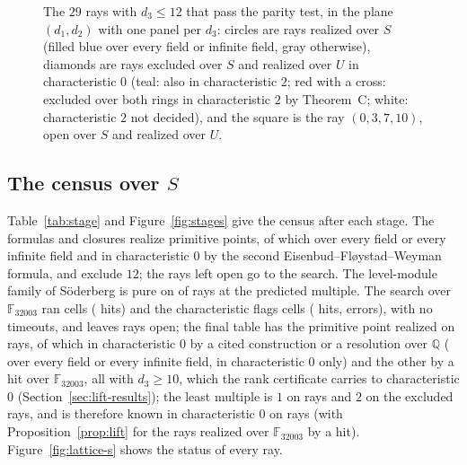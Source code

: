 \documentclass[11pt]{article}
\theoremstyle{definition}
\theoremstyle{remark}
\newcommand{\Q}{\mathbb{Q}}
\newcommand{\F}{\mathbb{F}}
\begin{document}
\begin{figure}[htbp]
\centering

\caption{The $29$ rays with $d_3\le12$ that pass the parity test, in the plane $(d_1,d_2)$ with one panel per $d_3$: circles are rays realized over $S$ (filled blue over every field or infinite field, gray otherwise), diamonds are rays excluded over $S$ and realized over $U$ in characteristic $0$ (teal: also in characteristic $2$; red with a cross: excluded over both rings in characteristic $2$ by Theorem~C; white: characteristic $2$ not decided), and the square is the ray $(0,3,7,10)$, open over $S$ and realized over $U$.}
\label{fig:lattice-u}
\end{figure}

\subsection{The census over \texorpdfstring{$S$}{S}}

\begin{table}[htbp]
\centering\footnotesize

\caption{The census of the \nrays{} rays with $d_3\le12$ after each stage: number of rays whose primitive point is realized in some field, realized over every field or every infinite field, realized in characteristic $0$, excluded, open, and number of rays on which the least multiple $c_d$ is known; the stage with the rank certificates gives the final table.}
\label{tab:stage}
\end{table}

Table~\ref{tab:stage} and Figure~\ref{fig:stages} give the census after each stage. The formulas and closures realize \nstageZeroRealized{} primitive points, of which \nstageZeroEvery{} over every field or every infinite field and \nstageZeroWeyman{} in characteristic $0$ by the second Eisenbud--Fl{\o}ystad--Weyman formula, and exclude $12$; the \nstageZeroOpen{} rays left open go to the search. The level-module family of S\"oderberg is pure on \nsoderbergPure{} of \nsoderbergRays{} rays at the predicted multiple. The search over $\F_{32003}$ ran \ncellsMain{} cells (\nhitsMain{} hits) and the characteristic flags \ncellsOneE{} cells (\nhitsFlag{} hits, \ncellsErr{} errors), with no timeouts, and leaves \nopen{} rays open; the final table has the primitive point realized on \nrealized{} rays, of which \nrealizedZero{} in characteristic $0$ by a cited construction or a resolution over $\Q$ (\nrealizedEvery{} over every field or every infinite field, \nrealizedZeroOnly{} in characteristic $0$ only) and the other \nrealizedPrimeOnly{} by a hit over $\F_{32003}$, all with $d_3\ge10$, which the rank certificate carries to characteristic $0$ (Section~\ref{sec:lift-results}); the least multiple is $1$ on \nrealized{} rays and $2$ on the \nexcluded{} excluded rays, and is therefore known in characteristic $0$ on \ncDetermined{} rays (with Proposition~\ref{prop:lift} for the rays realized over $\F_{32003}$ by a hit). Figure~\ref{fig:lattice-s} shows the status of every ray.
\end{document}
